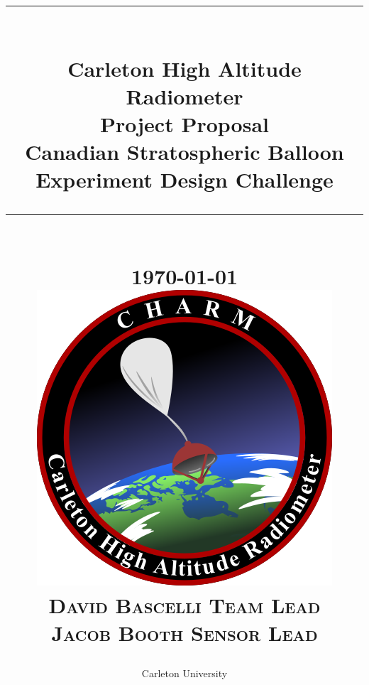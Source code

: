 \documentclass[12pt]{article}
\newcommand{\HRule}[1]{\rule{\linewidth}{#1}}
\begin{document}


\title{ \normalsize \textsc{}
		\\ [2.0cm]
		\HRule{0.5pt} \\
		\LARGE \textbf{{Carleton High Altitude Radiometer}}\\
		\large \textbf{{Project Proposal}}\\
		\large \textbf{{Canadian Stratospheric Balloon Experiment Design Challenge}}
		\HRule{2pt} \\ [0.5cm]
		\normalsize \today \vspace*{2\baselineskip}\\
		\includegraphics[scale=0.6]{Figures/CHARM.png}	\vspace*{2\baselineskip} \\
		\textsc{
		David Bascelli \quad Team Lead \\
		Jacob Booth \quad Sensor Lead \\
		}}
		
\date{}
	
\author{
		Carleton University \\
		}
	


\maketitle

\newpage

\tableofcontents
\newpage

\listoffigures
\newpage
\end{document}
